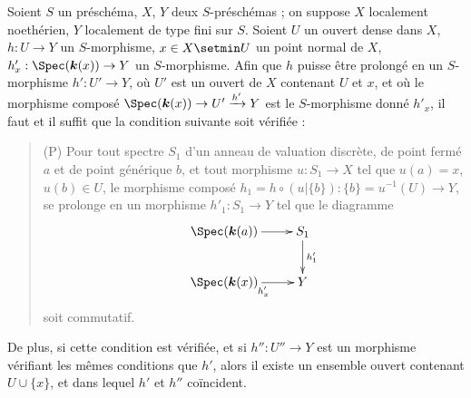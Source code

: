 \begin{proposition}[20.4.6]
\label{IV.20.4.6}
Soient $S$ un préschéma, $X$, $Y$ deux $S$-préschémas ; on suppose $X$ localement noethérien, $Y$ localement de type fini sur $S$.
Soient $U$ un ouvert dense dans $X$, $h:U\to Y$ un $S$-morphisme, $x\in X\setmin U$ un point \textup{normal} de $X$, $h'_x:\Spec(\boldsymbol{k}(x))\to Y$ un $S$-morphisme.
Afin que $h$ puisse être prolongé en un $S$-morphisme $h':U'\to Y$, où $U'$ est un ouvert de $X$ contenant $U$ et $x$, et où le morphisme composé $\Spec(\boldsymbol{k}(x))\to U'\xrightarrow{h'}Y$ est le $S$-morphisme donné $h'_x$, il faut et il suffit que la condition suivante soit vérifiée :
\begin{quote}
\textup{(P)} Pour tout spectre $S_1$ d'un anneau de valuation discrète, de point fermé $a$ et de point générique $b$, et tout morphisme $u:S_1\to X$ tel que $u(a)=x$, $u(b)\in U$, le morphisme composé $h_1=h\circ(u|\{b\}):\{b\}=u^{-1}(U)\to Y$, se prolonge en un morphisme $h'_1:S_1\to Y$ tel que le diagramme
\[
  \xymatrix{
  \Spec(\boldsymbol{k}(a)) \ar[r] & S_1 \ar[d]^{h'_1} \\
  \Spec(\boldsymbol{k}(x)) \ar[r]_{h'_x} & Y
  }
\]
soit commutatif.
\end{quote}

De plus, si cette condition est vérifiée, et si $h'':U''\to Y$ est un morphisme vérifiant les mêmes conditions que $h'$, alors il existe un ensemble ouvert contenant $U\cup\{x\}$, et dans lequel $h'$ et $h''$ coïncident.
\end{proposition}

